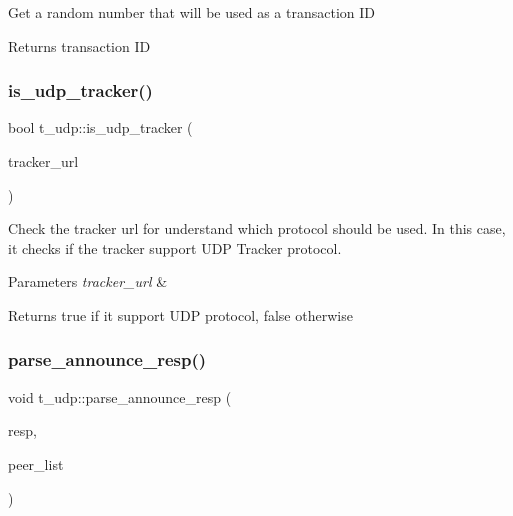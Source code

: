 Get a random number that will be used as a transaction ID

\begin{DoxyReturn}{Returns}
transaction ID 
\end{DoxyReturn}
\mbox{\label{namespacet__udp_af6fbd38370a6f5f7d8520144de7104c4}} 
\subsubsection{\texorpdfstring{is\+\_\+udp\+\_\+tracker()}{is\_udp\_tracker()}}
{\footnotesize\ttfamily bool t\+\_\+udp\+::is\+\_\+udp\+\_\+tracker (\begin{DoxyParamCaption}\item[{const std\+::string \&}]{tracker\+\_\+url }\end{DoxyParamCaption})}

Check the tracker url for understand which protocol should be used. In this case, it check\textquotesingle{}s if the tracker support U\+DP Tracker protocol.


\begin{DoxyParams}{Parameters}
{\em tracker\+\_\+url} & \\
\hline
\end{DoxyParams}
\begin{DoxyReturn}{Returns}
true if it support U\+DP protocol, false otherwise 
\end{DoxyReturn}
\mbox{\label{namespacet__udp_a1f2a0ab9801cbc55002e67c166895a0e}} 
\subsubsection{\texorpdfstring{parse\+\_\+announce\+\_\+resp()}{parse\_announce\_resp()}}
{\footnotesize\ttfamily void t\+\_\+udp\+::parse\+\_\+announce\+\_\+resp (\begin{DoxyParamCaption}\item[{std\+::vector$<$ uint8\+\_\+t $>$ \&}]{resp,  }\item[{pwp\+::\+Peer\+List}]{peer\+\_\+list }\end{DoxyParamCaption})}

